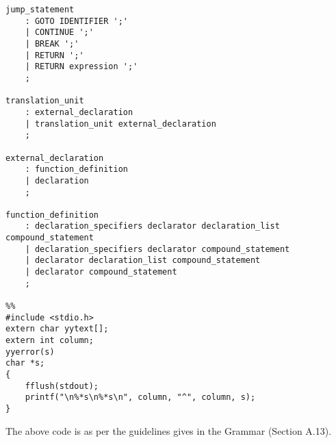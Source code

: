 \documentclass[a4paper,11pt]{article}
\theoremstyle{mytheor}
\begin{document}
\begin{lstlisting}[label={list:second},caption=Yacc code.]
jump_statement
	: GOTO IDENTIFIER ';'
	| CONTINUE ';'
	| BREAK ';'
	| RETURN ';'
	| RETURN expression ';'
	;

translation_unit
	: external_declaration
	| translation_unit external_declaration
	;

external_declaration
	: function_definition
	| declaration
	;

function_definition
	: declaration_specifiers declarator declaration_list compound_statement
	| declaration_specifiers declarator compound_statement
	| declarator declaration_list compound_statement
	| declarator compound_statement
	;

%%
#include <stdio.h>
extern char yytext[];
extern int column;
yyerror(s)
char *s;
{
	fflush(stdout);
	printf("\n%*s\n%*s\n", column, "^", column, s);
}
\end{lstlisting}

The above code is as per the guidelines gives in the Grammar (Section A.13). 
\end{document}
